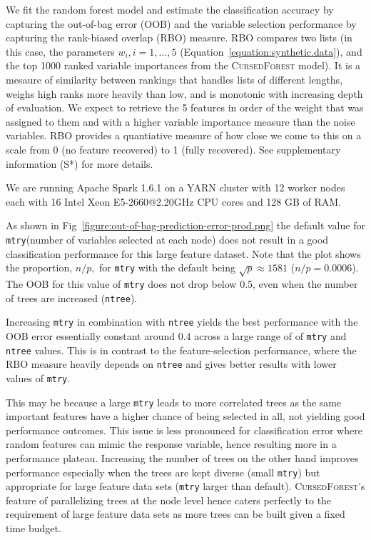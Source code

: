 \documentclass[10pt,letterpaper]{article}
\newcommand{\cursedforest}{\textsc{CursedForest}\xspace}
\newcommand{\mtry}{\texttt{mtry}\xspace}
\newcommand{\ntree}{\texttt{ntree}\xspace}
\begin{document}
We fit the random forest model and estimate the classification accuracy by capturing the out-of-bag error (OOB) and the
variable selection performance by capturing the rank-biased overlap (RBO) \cite{Webber2010} measure. RBO compares two
lists (in this case, the parameters $w_i, i=1,\ldots , 5$ (Equation~\ref{equation:synthetic.data}), and the top 1000
ranked variable importances from the \cursedforest model). It is a mesaure of similarity between rankings that handles
lists of different lengths, weighs high ranks more heavily than low, and is monotonic with increasing depth of
evaluation. We expect to retrieve the 5 features in order of the weight that was assigned to them and with a higher
variable importance measure than the noise variables. RBO provides a quantiative measure of how close we come to this on
a scale from 0 (no feature recovered) to 1 (fully recovered). See supplementary information (S*) for more details.

We are running Apache Spark 1.6.1 on a YARN
cluster with 12 worker nodes each with 16 Intel Xeon E5-2660@2.20GHz CPU cores and 128 GB of RAM.



As shown in Fig~\ref{figure:out-of-bag-prediction-error-prod.png} the default value for \mtry (number of variables
selected at each node) does not result in a good classification performance for this large feature dataset. Note that
the plot shows the proportion, $n/p,$ for \mtry with the default being $\sqrt{p} \approx 1581$ ($n/p=0.0006$).  The
OOB for this value of \mtry does not drop below 0.5, even when the number of trees are increased (\ntree).

Increasing \mtry in combination with \ntree yields the best performance with the OOB error essentially constant around 0.4
across a large range of of \mtry and \ntree values.  This is in contrast to the feature-selection performance, where the
RBO measure heavily depends on \ntree and gives better results with lower values of \mtry.

This may be because a large \mtry leads to more correlated trees as the same important features have a higher chance of
being selected in all, not yielding good performance outcomes.  This issue is less pronounced for classification error
where random features can mimic the response variable, hence resulting more in a performance plateau.  Increasing the
number of trees on the other hand improves performance especially when the trees are kept diverse (small \mtry) but
appropriate for large feature data sets (\mtry larger than default). \cursedforest's feature of parallelizing trees at
the node level hence caters perfectly to the requirement of large feature data sets as more trees can be built given a
fixed time budget.
\end{document}
